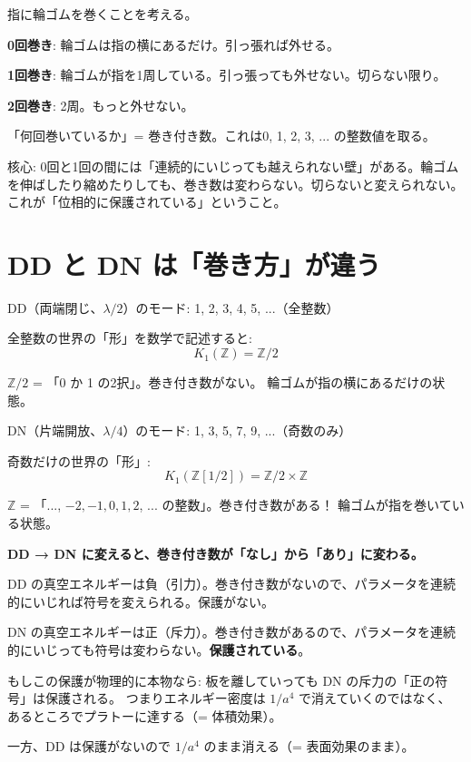 \documentclass[12pt,a4paper]{article}
\begin{document}
\begin{storybox}[指に巻いた輪ゴム]
指に輪ゴムを巻くことを考える。

\textbf{0回巻き}: 輪ゴムは指の横にあるだけ。引っ張れば外せる。

\textbf{1回巻き}: 輪ゴムが指を1周している。引っ張っても外せない。切らない限り。

\textbf{2回巻き}: 2周。もっと外せない。

「何回巻いているか」= 巻き付き数。これは0, 1, 2, 3, ... の整数値を取る。

核心: 0回と1回の間には「連続的にいじっても越えられない壁」がある。輪ゴムを伸ばしたり縮めたりしても、巻き数は変わらない。切らないと変えられない。これが「位相的に保護されている」ということ。
\end{storybox}

\section{DD と DN は「巻き方」が違う}

\begin{mathbox}[DD = 巻いていない、DN = 巻いている]
DD（両端閉じ、$\lambda/2$）のモード: 1, 2, 3, 4, 5, ...（全整数）

全整数の世界の「形」を数学で記述すると:
$$K_1(\mathbb{Z}) = \mathbb{Z}/2$$

$\mathbb{Z}/2$ = 「0 か 1 の2択」。巻き付き数がない。
輪ゴムが指の横にあるだけの状態。

DN（片端開放、$\lambda/4$）のモード: 1, 3, 5, 7, 9, ...（奇数のみ）

奇数だけの世界の「形」:
$$K_1(\mathbb{Z}[1/2]) = \mathbb{Z}/2 \times \mathbb{Z}$$

$\mathbb{Z}$ = 「..., $-2, -1, 0, 1, 2$, ... の整数」。巻き付き数がある！
輪ゴムが指を巻いている状態。

\textbf{DD → DN に変えると、巻き付き数が「なし」から「あり」に変わる。}
\end{mathbox}

\begin{storybox}[これが意味すること]
DD の真空エネルギーは負（引力）。巻き付き数がないので、パラメータを連続的にいじれば符号を変えられる。保護がない。

DN の真空エネルギーは正（斥力）。巻き付き数があるので、パラメータを連続的にいじっても符号は変わらない。\textbf{保護されている}。

もしこの保護が物理的に本物なら:
板を離していっても DN の斥力の「正の符号」は保護される。
つまりエネルギー密度は $1/a^4$ で消えていくのではなく、
あるところでプラトーに達する（= 体積効果）。

一方、DD は保護がないので $1/a^4$ のまま消える（= 表面効果のまま）。
\end{storybox}
\end{document}
